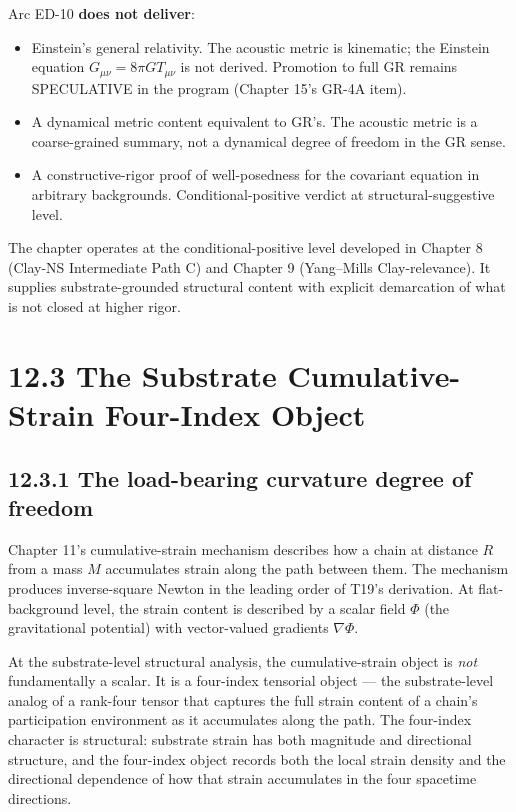 \documentclass[11pt]{book}
\begin{document}
Arc ED-10 \textbf{does not deliver}:
\begin{itemize}
\item Einstein's general relativity. The acoustic metric is kinematic; the Einstein equation $G_{\mu\nu} = 8\pi G T_{\mu\nu}$ is not derived. Promotion to full GR remains SPECULATIVE in the program (Chapter 15's GR-4A item).
\item A dynamical metric content equivalent to GR's. The acoustic metric is a coarse-grained summary, not a dynamical degree of freedom in the GR sense.
\item A constructive-rigor proof of well-posedness for the covariant equation in arbitrary backgrounds. Conditional-positive verdict at structural-suggestive level.
\end{itemize}

The chapter operates at the conditional-positive level developed in Chapter 8 (Clay-NS Intermediate Path C) and Chapter 9 (Yang–Mills Clay-relevance). It supplies substrate-grounded structural content with explicit demarcation of what is not closed at higher rigor.

\section{12.3 The Substrate Cumulative-Strain Four-Index Object}

\subsection{12.3.1 The load-bearing curvature degree of freedom}

Chapter 11's cumulative-strain mechanism describes how a chain at distance $R$ from a mass $M$ accumulates strain along the path between them. The mechanism produces inverse-square Newton in the leading order of T19's derivation. At flat-background level, the strain content is described by a scalar field $\Phi$ (the gravitational potential) with vector-valued gradients $\nabla\Phi$.

At the substrate-level structural analysis, the cumulative-strain object is \textit{not} fundamentally a scalar. It is a four-index tensorial object — the substrate-level analog of a rank-four tensor that captures the full strain content of a chain's participation environment as it accumulates along the path. The four-index character is structural: substrate strain has both magnitude and directional structure, and the four-index object records both the local strain density and the directional dependence of how that strain accumulates in the four spacetime directions.
\end{document}
